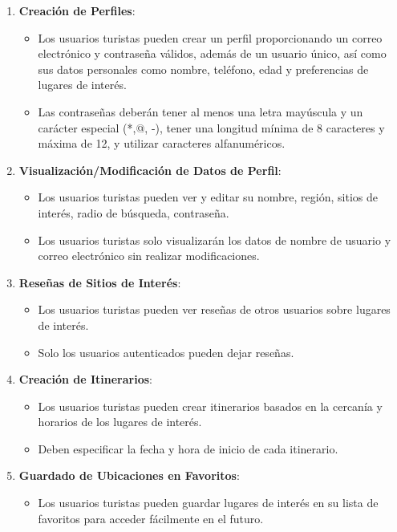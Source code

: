 \documentclass{article}
\begin{document}
\begin{enumerate}
    \item \textbf{Creación de Perfiles}:
    \begin{itemize}
        \item Los usuarios turistas pueden crear un perfil proporcionando un correo electrónico y contraseña válidos, además de un usuario único, así como sus datos personales como nombre, teléfono, edad y preferencias de lugares de interés.
        \item Las contraseñas deberán tener al menos una letra mayúscula y un carácter especial (*,@, -), tener una longitud mínima de 8 caracteres y máxima de 12, y utilizar caracteres alfanuméricos.
    \end{itemize}
    
    \item \textbf{Visualización/Modificación de Datos de Perfil}:
    \begin{itemize}
        \item Los usuarios turistas pueden ver y editar su nombre, región, sitios de interés, radio de búsqueda, contraseña.
        \item Los usuarios turistas solo visualizarán los datos de nombre de usuario y correo electrónico sin realizar modificaciones.
    \end{itemize}
    
    \item \textbf{Reseñas de Sitios de Interés}:
    \begin{itemize}
        \item Los usuarios turistas pueden ver reseñas de otros usuarios sobre lugares de interés.
        \item Solo los usuarios autenticados pueden dejar reseñas.
    \end{itemize}
    
    \item \textbf{Creación de Itinerarios}:
    \begin{itemize}
        \item Los usuarios turistas pueden crear itinerarios basados en la cercanía y horarios de los lugares de interés.
        \item Deben especificar la fecha y hora de inicio de cada itinerario.
    \end{itemize}
    
    \item \textbf{Guardado de Ubicaciones en Favoritos}:
    \begin{itemize}
        \item Los usuarios turistas pueden guardar lugares de interés en su lista de favoritos para acceder fácilmente en el futuro.
    \end{itemize}
    

\end{enumerate}
\end{document}
